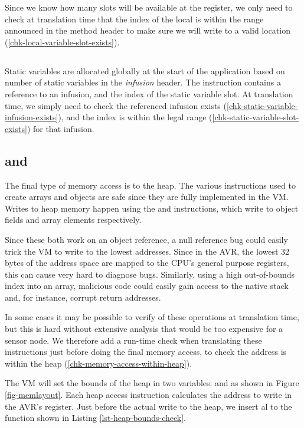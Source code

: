 Since we know how many slots will be available at the  register, we only need to check at translation time that the index of the local is within the range announced in the method header to make sure we will write to a valid location (\ref{chk-local-variable-slot-exists}).

\subsection{}
Static variables are allocated globally at the start of the application based on number of static variables in the \emph{infusion} header. The  instruction contains a reference to an infusion, and the index of the static variable slot. At translation time, we simply need to check the referenced infusion exists (\ref{chk-static-variable-infusion-exists}), and the index is within the legal range (\ref{chk-static-variable-slot-exists}) for that infusion.

\subsection{ and }
\label{sec-safety-heap-access}
The final type of memory access is to the heap. The various  instructions used to create arrays and objects are safe since they are fully implemented in the VM. Writes to heap memory happen using the  and  instructions, which write to object fields and array elements respectively. 

Since these both work on an object reference, a null reference bug could easily trick the VM to write to the lowest addresses. Since in the AVR, the lowest 32 bytes of the address space are mapped to the CPU's general purpose registers, this can cause very hard to diagnose bugs. Similarly, using a high out-of-bounds index into an array, malicious code could easily gain access to the native stack and, for instance, corrupt return addresses.

In some cases it may be possible to verify of these operations at translation time, but this is hard without extensive analysis that would be too expensive for a sensor node. We therefore add a run-time check when translating these instructions just before doing the final memory access, to check the address is within the heap (\ref{chk-memory-access-within-heap}).

The VM will set the bounds of the heap in two variables:  and  as shown in Figure \ref{fig-memlayout}. Each heap access instruction calculates the address to write in the AVR's  register. Just before the actual write to the heap, we insert al  to the  function shown in Listing \ref{lst-heap-bounds-check}.

